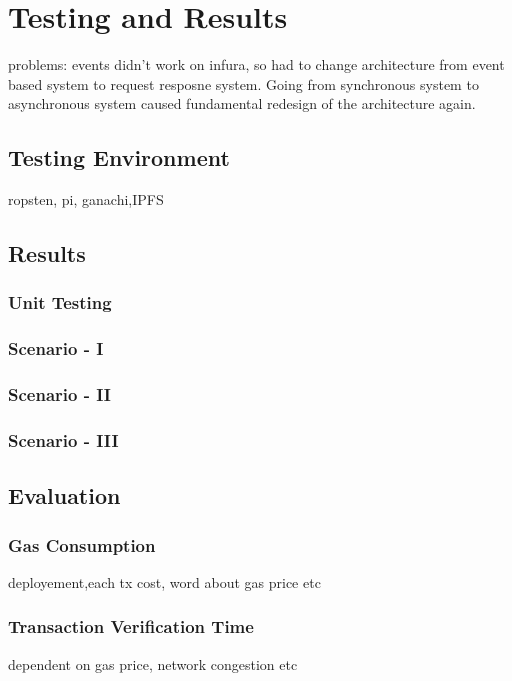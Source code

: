 \section{Testing and Results}
problems: events didn't work on infura, so had to change architecture from event based system to request resposne system. Going from synchronous system to asynchronous system caused fundamental redesign of the architecture again. 
\subsection{Testing Environment}
ropsten, pi, ganachi,IPFS
\subsection{Results}
\subsubsection{Unit Testing}
\subsubsection{Scenario - I}
\subsubsection{Scenario - II}
\subsubsection{Scenario - III}
\subsection{Evaluation}
\subsubsection{Gas Consumption}
deployement,each tx cost, word about gas price etc
\subsubsection{Transaction Verification Time}
dependent on gas price, network congestion etc